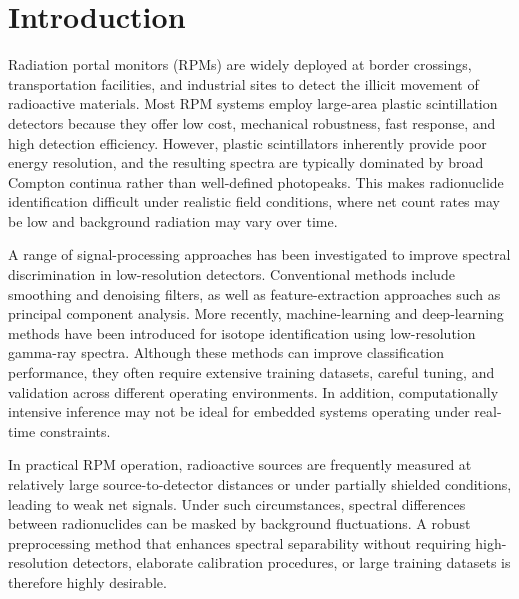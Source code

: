 \documentclass[pdflatex,sn-mathphys-num, table]{sn-jnl}%
\theoremstyle{thmstyleone}%
\theoremstyle{thmstyletwo}%
\theoremstyle{thmstylethree}%
\begin{document}


\section*{Introduction}\label{sec1}

Radiation portal monitors (RPMs) are widely deployed at border crossings, transportation facilities, and industrial sites to detect the illicit movement of radioactive materials\cite{Sicilliano2005Comparision, Bertrand2014Current,Ely2006TheUse}. Most RPM systems employ large-area plastic scintillation detectors because they offer low cost, mechanical robustness, fast response, and high detection efficiency\cite{Hevener2013EWindow, Lee2020Radioisotope, Paff2017Spectral}. However, plastic scintillators inherently provide poor energy resolution, and the resulting spectra are typically dominated by broad Compton continua rather than well-defined photopeaks. This makes radionuclide identification difficult under realistic field conditions, where net count rates may be low and background radiation may vary over time. 

A range of signal-processing approaches has been investigated to improve spectral discrimination in low-resolution detectors. Conventional methods include smoothing and denoising filters\cite{Paff2017Spectral}, as well as feature-extraction approaches such as principal component analysis\cite{Runkle2006Analysis,Kim2019InvMat}. More recently, machine-learning and deep-learning methods have been introduced for isotope identification using low-resolution gamma-ray spectra\cite{Kim2019ANN, Lee2023Radionuclide,Jeon2021CompML}. Although these methods can improve classification performance, they often require extensive training datasets, careful tuning, and validation across different operating environments. In addition, computationally intensive inference may not be ideal for embedded systems operating under real-time constraints.

In practical RPM operation, radioactive sources are frequently measured at relatively large source-to-detector distances or under partially shielded conditions, leading to weak net signals. Under such circumstances, spectral differences between radionuclides can be masked by background fluctuations. A robust preprocessing method that enhances spectral separability without requiring high-resolution detectors, elaborate calibration procedures, or large training datasets is therefore highly desirable.
\end{document}
